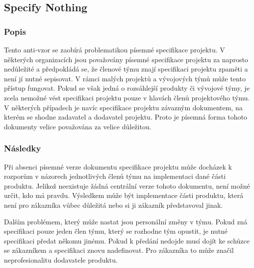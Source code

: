 \documentclass[czech,DP]{thesiskiv}
\begin{document}
\subsection{Specify Nothing}
\subsubsection{Popis}
Tento anti-vzor se zaobírá problematikou písemné specifikace projektu. V některých organizacích jsou považovány písemné specifikace projektu za naprosto nedůležité a předpokládá se, že členové týmu znají specifikaci projektu zpaměti a není jí nutné sepisovat. V rámci malých projektů a vývojových týmů může tento přístup fungovat. Pokud se však jedná o rozsáhlejší produkty či vývojové týmy, je zcela nemožné vést specifikaci projektu pouze v hlavách členů projektového týmu. \cite{specify_nothing} V některých případech je navíc specifikace projektu závazným dokumentem, na kterém se shodne zadavatel a dodavatel projektu. Proto je písemná forma tohoto dokumenty velice považována za velice důležitou.
\subsubsection{Následky}
Při absenci písemné verze dokumentu specifikace projektu může docházek k rozporům v názorech jednotlivých členů týmu na implementaci dané části produktu. Jelikož neexistuje žádná centrální verze tohoto dokumentu, není možné určit, kdo má pravdu. Výsledkem může být implementace části produktu, která není pro zákazníka vůbec důležitá nebo si ji zákazník představoval jinak.
\par
Dalším problémem, který může nastat jsou personální změny v týmu. Pokud zná specifikaci pouze jeden člen týmu, který se rozhodne tým opustit, je nutné specifikaci předat někomu jinému. Pokud k předání nedojde musí dojít ke schůzce se zákazníkem a specifikaci znovu nadefinovat. Pro zákazníka to může značil neprofesionalitu dodavatele produktu.
\end{document}
